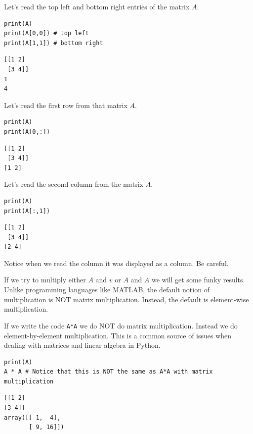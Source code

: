 \begin{example}
    Let's read the top left and bottom right entries of the matrix $A$.

\bcode
\begin{lstlisting}
print(A)
print(A[0,0]) # top left
print(A[1,1]) # bottom right
\end{lstlisting}
\boutput
\begin{lstlisting}
[[1 2]
 [3 4]]
1
4
\end{lstlisting}
    
\end{example}

\begin{example}
    Let's read the first row from that matrix $A$.

\bcode
\begin{lstlisting}
print(A)
print(A[0,:])
\end{lstlisting}
\boutput
\begin{lstlisting}
[[1 2]
 [3 4]]
[1 2]
\end{lstlisting}
\end{example}


\begin{example}
    Let's read the second column from the matrix $A$.

\bcode
\begin{lstlisting}
print(A)
print(A[:,1])
\end{lstlisting}
\boutput
\begin{lstlisting}
[[1 2]
 [3 4]]
[2 4]
\end{lstlisting}
Notice when we read the column it was displayed as a column.  Be careful.

\end{example}

If we try to multiply either $A$ and $v$ or $A$ and $A$ we will get some funky results.
Unlike programming languages like MATLAB, the default notion of multiplication is NOT
matrix multiplication.  Instead, the default is element-wise multiplication.

\begin{example}
    If we write the code \texttt{A*A} we do NOT do matrix multiplication.  Instead we do
    element-by-element multiplication.  This is a common source of issues when dealing
    with matrices and linear algebra in Python.

\bcode
\begin{lstlisting}
print(A)
A * A # Notice that this is NOT the same as A*A with matrix multiplication
\end{lstlisting}
\boutput
\begin{lstlisting}
[[1 2]
[3 4]]
array([[ 1,  4],
       [ 9, 16]])
\end{lstlisting}
\end{example}

